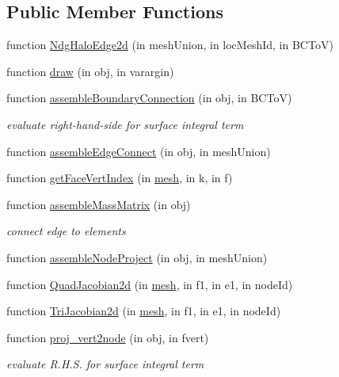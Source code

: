 \subsection*{Public Member Functions}
\begin{DoxyCompactItemize}
\item 
function \hyperlink{class_ndg_halo_edge2d_a58921234d02fda0ad5adfa53b70f4056}{Ndg\+Halo\+Edge2d} (in mesh\+Union, in loc\+Mesh\+Id, in B\+C\+ToV)
\item 
function \hyperlink{class_ndg_halo_edge2d_aadb1e016676ce8349106588b2991abeb}{draw} (in obj, in varargin)
\item 
function \hyperlink{class_ndg_halo_edge2d_aab1b0722dd2f3affed7ca4df507171db}{assemble\+Boundary\+Connection} (in obj, in B\+C\+ToV)
\begin{DoxyCompactList}\small\item\em evaluate right-\/hand-\/side for surface integral term \end{DoxyCompactList}\item 
function \hyperlink{class_ndg_halo_edge2d_a52b79df0ba100db8d7a826fdd1de7c78}{assemble\+Edge\+Connect} (in obj, in mesh\+Union)
\item 
function \hyperlink{class_ndg_halo_edge2d_af6a746330fa01b27974ac28d7df84491}{get\+Face\+Vert\+Index} (in \hyperlink{class_ndg_inner_edge_a703bdf93b4da38294056ccc9e4042491}{mesh}, in k, in f)
\item 
function \hyperlink{class_ndg_halo_edge2d_a4ae3c2e4b00ae7fae04b28b73a6b8fd2}{assemble\+Mass\+Matrix} (in obj)
\begin{DoxyCompactList}\small\item\em connect edge to elements \end{DoxyCompactList}\item 
function \hyperlink{class_ndg_halo_edge2d_ab02595a3625e0f914cd8434928c2c605}{assemble\+Node\+Project} (in obj, in mesh\+Union)
\item 
function \hyperlink{class_ndg_halo_edge2d_a4264757b6cfc279cc7ac0691abccf34d}{Quad\+Jacobian2d} (in \hyperlink{class_ndg_inner_edge_a703bdf93b4da38294056ccc9e4042491}{mesh}, in f1, in e1, in node\+Id)
\item 
function \hyperlink{class_ndg_halo_edge2d_af19f32edd2a610c785173fc7f4f2c905}{Tri\+Jacobian2d} (in \hyperlink{class_ndg_inner_edge_a703bdf93b4da38294056ccc9e4042491}{mesh}, in f1, in e1, in node\+Id)
\item 
function \hyperlink{class_ndg_halo_edge2d_a42d07a715bfed451327eedba3c0dc11f}{proj\+\_\+vert2node} (in obj, in fvert)
\begin{DoxyCompactList}\small\item\em evaluate R.\+H.\+S. for surface integral term \end{DoxyCompactList}\end{DoxyCompactItemize}
